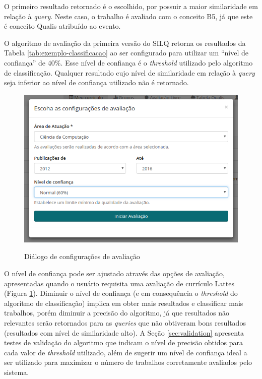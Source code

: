 \documentclass[12pt]{article}
\newcommand{\quotes}[1]{``#1''}
\begin{document}
O primeiro resultado retornado é o escolhido, por possuir a maior similaridade em relação à \textit{query}. Neste caso, o trabalho é avaliado com o conceito B5, já que este é conceito Qualis atribuído ao evento.

O algoritmo de avaliação da primeira versão do SILQ retorna os resultados da Tabela \ref{tab:exemplo-classificacao} ao ser configurado para utilizar um \quotes{nível de confiança} de 40\%. Esse nível de confiança é o \textit{threshold} utilizado pelo algoritmo de classificação. Qualquer resultado cujo nível de similaridade em relação à \textit{query} seja inferior ao nível de confiança utilizado não é retornado.

\begin{figure}[!h]
   \centering
   \caption{Diálogo de configurações de avaliação}
   \includegraphics[width=\textwidth]{../figuras/config-avaliacao.png}
   \label{fig:config-avaliacao}
\end{figure}

O nível de confiança pode ser ajustado através das opções de avaliação, apresentadas quando o usuário requisita uma avaliação de currículo Lattes (Figura \ref{fig:config-avaliacao}). Diminuir o nível de confiança (e em consequência o \textit{threshold} do algoritmo de classificação) implica em obter mais resultados e classificar mais trabalhos, porém diminuir a precisão do algoritmo, já que resultados não relevantes serão retornados para as \textit{queries} que não obtiveram bons resultados (resultados com nível de similaridade alto). A Seção \ref{sec:validation} apresenta testes de validação do algoritmo que indicam o nível de precisão obtidos para cada valor de \textit{threshold} utilizado, além de sugerir um nível de confiança ideal a ser utilizado para maximizar o número de trabalhos corretamente avaliados pelo sistema.
\end{document}
